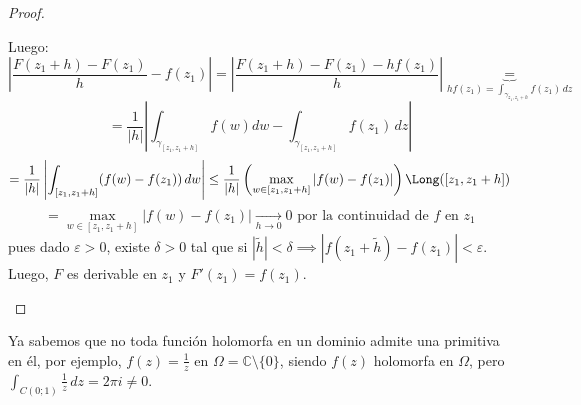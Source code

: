 \begin{proof}
\begin{enumerate}
\[        \]
        Luego:
        \[
        \left| \frac{F(z_1 + h) - F(z_1)}{h} - f(z_1) \right| =
        \left| \frac{F(z_1 + h) - F(z_1) - hf(z_1)}{h} \right| \underbrace{=}_{hf(z_1)=\int_{\gamma_{z_1, z_1 + h}} f(z_1) \, dz}
        \]
        \[
        = \frac{1}{|h|} \left| \int_{\gamma_{[z_1, z_1 + h]}} f(w) dw - \int_{\gamma_{[z_1, z_1 + h]}} f(z_1) \, dz \right| 
        \]
        \[
        = \frac{1}{|h|} \left| \int_{[z_1, z_1 + h]} (f(w) - f(z_1)) \, dw \right| \leq \frac{1}{|h|} \left(\max_{w \in [z_1, z_1 + h]} |f(w) - f(z_1)| \right) \Long([z_1, z_1 + h]) 
        \]
        \[
            = \max_{w \in [z_1, z_1 + h]} |f(w) - f(z_1)| \xrightarrow[h \to 0]{} 0 \text{ por la continuidad de } f \text{ en } z_1
        \]
        pues dado $\varepsilon > 0$, existe $\delta > 0$ tal que si $|\tilde{h} | < \delta \implies |f(z_1 + \tilde{h}) - f(z_1)| < \varepsilon$. Luego, $F$ es derivable en $z_1$ y $F'(z_1) = f(z_1)$.
    \end{enumerate}
\end{proof}

Ya sabemos que no toda función holomorfa en un dominio admite una primitiva en él, por ejemplo, $f(z) = \frac{1}{z}$ en $\Omega = \mathbb{C} \setminus \{0\}$, siendo $f(z)$ holomorfa en $\Omega$, pero $\int_{C(0;1)} \frac{1}{z} \, dz = 2\pi i \neq 0$.\\